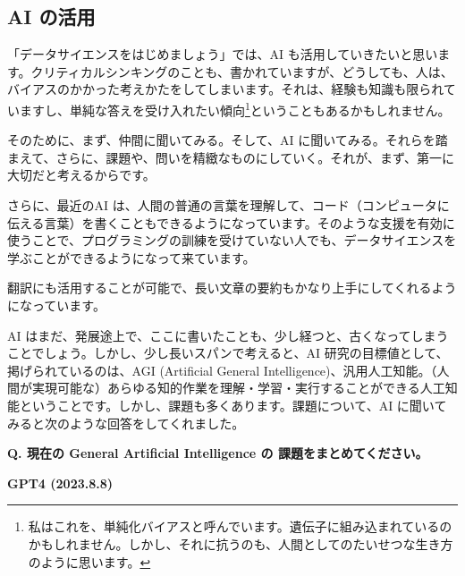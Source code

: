 \documentclass[
  xelatex, ja=standard]{bxjsbook}
\theoremstyle{definition}
\theoremstyle{definition}
\theoremstyle{definition}
\theoremstyle{definition}
\theoremstyle{remark}
\begin{document}
\hypertarget{ai-ux306eux6d3bux7528}{%
\subsection{AI の活用}\label{ai-ux306eux6d3bux7528}}

「データサイエンスをはじめましょう」では、AI も活用していきたいと思います。クリティカルシンキングのことも、書かれていますが、どうしても、人は、バイアスのかかった考えかたをしてしまいます。それは、経験も知識も限られていますし、単純な答えを受け入れたい傾向\footnote{私はこれを、単純化バイアスと呼んでいます。遺伝子に組み込まれているのかもしれません。しかし、それに抗うのも、人間としてのたいせつな生き方のように思います。}ということもあるかもしれません。

そのために、まず、仲間に聞いてみる。そして、AI に聞いてみる。それらを踏まえて、さらに、課題や、問いを精緻なものにしていく。それが、まず、第一に大切だと考えるからです。

さらに、最近のAI は、人間の普通の言葉を理解して、コード（コンピュータに伝える言葉）を書くこともできるようになっています。そのような支援を有効に使うことで、プログラミングの訓練を受けていない人でも、データサイエンスを学ぶことができるようになって来ています。

翻訳にも活用することが可能で、長い文章の要約もかなり上手にしてくれるようになっています。

AI はまだ、発展途上で、ここに書いたことも、少し経つと、古くなってしまうことでしょう。しかし、少し長いスパンで考えると、AI 研究の目標値として、掲げられているのは、AGI (Artificial General Intelligence)、汎用人工知能。（人間が実現可能な）あらゆる知的作業を理解・学習・実行することができる人工知能ということです。しかし、課題も多くあります。課題について、AI に聞いてみると次のような回答をしてくれました。

\textbf{Q. 現在の General Artificial Intelligence の 課題をまとめてください。}

\textbf{GPT4 (2023.8.8)}
\end{document}
